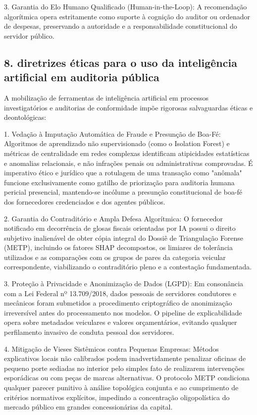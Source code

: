 \documentclass[12pt,a4paper]{article}
\begin{document}
3. Garantia do Elo Humano Qualificado (Human-in-the-Loop): A recomendação algorítmica opera estritamente como suporte à cognição do auditor ou ordenador de despesas, preservando a autoridade e a responsabilidade constitucional do servidor público.


\subsection{8. diretrizes éticas para o uso da inteligência artificial em auditoria pública}

A mobilização de ferramentas de inteligência artificial em processos investigatórios e auditorias de conformidade impõe rigorosas salvaguardas éticas e deontológicas:

1. Vedação à Imputação Automática de Fraude e Presunção de Boa-Fé: Algoritmos de aprendizado não supervisionado (como o Isolation Forest) e métricas de centralidade em redes complexas identificam atipicidades estatísticas e anomalias relacionais, e não infrações penais ou administrativas comprovadas. É imperativo ético e jurídico que a rotulagem de uma transação como "anômala" funcione exclusivamente como gatilho de priorização para auditoria humana pericial presencial, mantendo-se incólume a presunção constitucional de boa-fé dos fornecedores credenciados e dos agentes públicos.

2. Garantia do Contraditório e Ampla Defesa Algorítmica: O fornecedor notificado em decorrência de glosas fiscais orientadas por IA possui o direito subjetivo inalienável de obter cópia integral do Dossiê de Triangulação Forense (METP), incluindo os fatores SHAP decompostos, os limiares de tolerância utilizados e as comparações com os grupos de pares da categoria veicular correspondente, viabilizando o contraditório pleno e a contestação fundamentada.

3. Proteção à Privacidade e Anonimização de Dados (LGPD): Em consonância com a Lei Federal nº 13.709/2018, dados pessoais de servidores condutores e mecânicos foram submetidos a procedimento criptográfico de anonimização irreversível antes do processamento nos modelos. O pipeline de explicabilidade opera sobre metadados veiculares e valores orçamentários, evitando qualquer perfilamento invasivo de conduta pessoal dos servidores.

4. Mitigação de Vieses Sistêmicos contra Pequenas Empresas: Métodos explicativos locais não calibrados podem inadvertidamente penalizar oficinas de pequeno porte sediadas no interior pelo simples fato de realizarem intervenções esporádicas ou com peças de marcas alternativas. O protocolo METP condiciona qualquer parecer punitivo à análise topológica conjunta e ao cumprimento de critérios normativos explícitos, impedindo a concentração oligopolística do mercado público em grandes concessionárias da capital.
\end{document}
